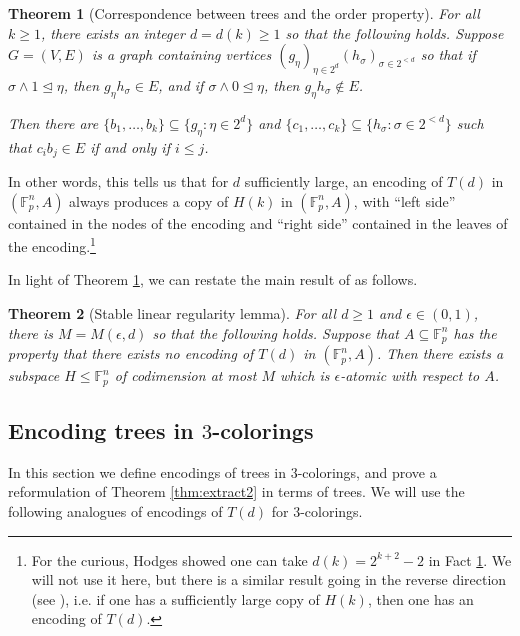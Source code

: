 \documentclass[12pt,oneside,british,a4wide]{amsart}
\newtheorem{theorem}{Theorem}[section]
\numberwithin{equation}{section}
\theoremstyle{definition}
\def\F{\mathbb{F}}
\def\e{\epsilon}
\begin{document}
\begin{theorem}[Correspondence between trees and the order property]\label{thm:hodges}
For all $k\geq 1$, there exists an integer $d=d(k)\geq 1$ so that the following holds.  Suppose $G=(V,E)$ is a graph containing vertices $(g_{\eta})_{\eta\in 2^d}(h_{\sigma})_{\sigma\in 2^{<d}}$ so that  if $\sigma \wedge 1\trianglelefteq \eta$, then $g_{\eta} h_{\sigma}\in E$, and if $\sigma \wedge 0\trianglelefteq \eta$, then $g_{\eta} h_{\sigma}\notin E$.   

 Then there are $\{b_1,\ldots, b_k\}\subseteq \{g_{\eta}: \eta\in 2^d\}$ and $\{c_1,\ldots, c_k\}\subseteq \{h_{\sigma}: \sigma\in 2^{<d}\}$ such that $c_i b_j\in E$ if and only if $i\leq j$.
\end{theorem}

In other words, this tells us that for $d$ sufficiently large, an encoding of $T(d)$ in $(\F_p^n,A)$ always produces a copy of $H(k)$ in $(\F_p^n,A)$, with ``left side'' contained in the nodes of the encoding and ``right side'' contained in the leaves of the encoding.\footnote{For the curious, Hodges showed one can take $d(k)=2^{k+2}-2$ in Fact \ref{thm:hodges}.  We will not use it here, but there is a similar result going in the reverse direction (see \cite{Hodges.1981}), i.e. if one has a sufficiently large copy of $H(k)$, then one has an encoding of $T(d)$.}  

In light of Theorem \ref{thm:hodges}, we can restate the main result of \cite{Terry.2019} as follows.

\begin{theorem}[Stable linear regularity lemma]\label{thm:linregtree}
For all $d\geq 1$ and $\e\in (0,1)$, there is $M=M(\e,d)$ so that the following holds. Suppose that $A\subseteq \F_p^n$ has the property that there exists no encoding of $T(d)$ in $(\F_p^n,A)$.  Then there exists a subspace $H\leqslant \F_p^n$ of codimension at most $M$ which is $\e$-atomic with respect to $A$.
\end{theorem}

\subsection{Encoding trees in $3$-colorings}


In this section we define encodings of trees in $3$-colorings, and prove a reformulation of Theorem \ref{thm:extract2} in terms of trees.  We will use the following analogues of encodings of $T(d)$ for $3$-colorings. 
\end{document}
